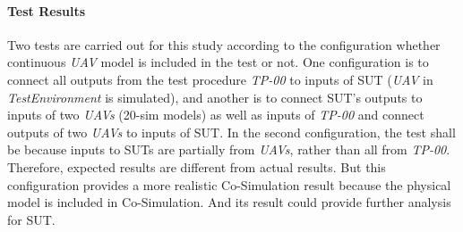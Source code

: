 \paragraph{Test Results}
Two tests are carried out for this study according to the configuration whether continuous \emph{UAV} model is included in the test or not. One configuration is to connect all outputs from the test procedure \emph{TP-00} to inputs of SUT (\emph{UAV} in \emph{TestEnvironment} is simulated), and another is to connect SUT's outputs to inputs of two \emph{UAVs} (20-sim models) as well as inputs of \emph{TP-00} and connect outputs of two \emph{UAVs} to inputs of SUT. In the second configuration, the test shall be  because inputs to SUTs are partially from \emph{UAVs}, rather than all from \emph{TP-00}. Therefore, expected results are different from actual results. But this configuration provides a more realistic Co-Simulation result because the physical model is included in Co-Simulation. And its result could provide further analysis for SUT.

